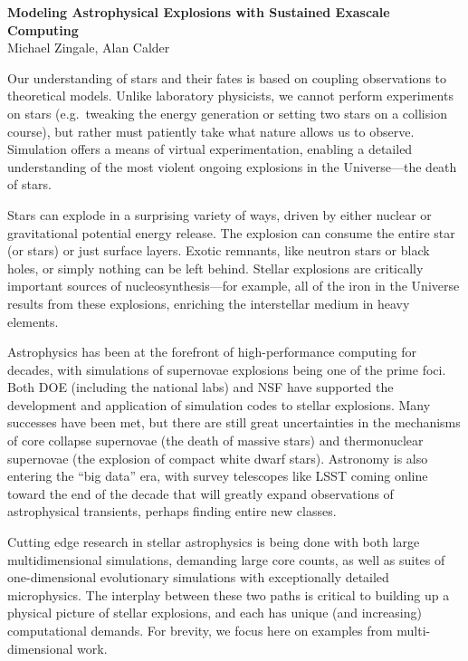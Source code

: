 \documentclass[11pt,twocolumn]{article}
\begin{document}
\begin{center}
{\sffamily \bfseries \large Modeling Astrophysical Explosions with Sustained Exascale Computing} \\
Michael Zingale\footnotemark[1], Alan Calder\footnotemark[1]
\end{center}


Our understanding of stars and their fates is based on coupling
observations to theoretical models.  Unlike laboratory physicists, we
cannot perform experiments on stars (e.g.\ tweaking the energy
generation or setting two stars on a collision course), but rather must
patiently take what nature allows us to observe.  Simulation offers a means
of virtual experimentation, enabling a detailed understanding of the
most violent ongoing explosions in the Universe---the death of stars.

Stars can explode in a surprising variety of ways, driven by either
nuclear or gravitational potential energy release.  The
explosion can consume the entire star (or stars) or just
surface layers.  Exotic remnants, like neutron stars or black holes, or
simply nothing can be left behind.  Stellar explosions are critically
important sources of nucleosynthesis---for example, all of the iron in
the Universe results from these explosions, enriching the interstellar
medium in heavy elements. 

Astrophysics has been at the forefront of high-performance computing
for decades, with simulations of supernovae explosions being one of
the prime foci.  Both DOE (including the national labs) and
NSF have supported the development and application of simulation codes
to stellar explosions.  Many successes have been met, but there are
still great uncertainties in the mechanisms of core collapse
supernovae (the death of massive stars) and thermonuclear supernovae
(the explosion of compact white dwarf stars).  Astronomy is also
entering the ``big data'' era, with survey telescopes like LSST coming
online toward the end of the decade that will greatly expand
observations of astrophysical transients, perhaps finding entire new
classes.

Cutting edge research in stellar astrophysics is being done with both
large multidimensional simulations, demanding large core counts, as
well as suites of one-dimensional evolutionary simulations with
exceptionally detailed microphysics.  The interplay between these two
paths is critical to building up a physical picture of stellar
explosions, and each has unique (and increasing) computational
demands.  For brevity, we focus here on examples from
multi-dimensional work.
\end{document}
